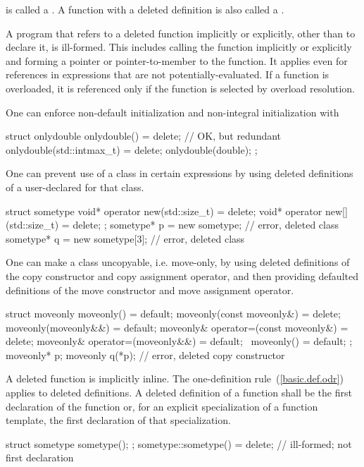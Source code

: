 is called a . A function with a
deleted definition is also called a .

\pnum
A program that refers to a deleted function implicitly or explicitly, other
than to declare it, is ill-formed. \enternote This includes calling the function
implicitly or explicitly and forming a pointer or pointer-to-member to the
function. It applies even for references in expressions that are not
potentially-evaluated. If a function is overloaded, it is referenced only if the
function is selected by overload resolution. \exitnote

\pnum
\enterexample One can enforce non-default initialization and non-integral
initialization with

\begin{codeblock}
struct onlydouble {
  onlydouble() = delete;              // OK, but redundant
  onlydouble(std::intmax_t) = delete;
  onlydouble(double);
};
\end{codeblock}

\exitexample

\enterexample One can prevent use of a
class in certain  expressions by using deleted definitions
of a user-declared  for that class.

\begin{codeblock}
struct sometype {
  void* operator new(std::size_t) = delete;
  void* operator new[](std::size_t) = delete;
};
sometype* p = new sometype;     // error, deleted class 
sometype* q = new sometype[3];  // error, deleted class 
\end{codeblock}
\exitexample

\enterexample One can make a class uncopyable, i.e. move-only, by using deleted
definitions of the copy constructor and copy assignment operator, and then
providing defaulted definitions of the move constructor and move assignment operator.

\begin{codeblock}
struct moveonly {
  moveonly() = default;
  moveonly(const moveonly&) = delete;
  moveonly(moveonly&&) = default;
  moveonly& operator=(const moveonly&) = delete;
  moveonly& operator=(moveonly&&) = default;
  ~moveonly() = default;
};
moveonly* p;
moveonly q(*p); // error, deleted copy constructor
\end{codeblock}
\exitexample

\pnum
A deleted function is implicitly inline. \enternote The
one-definition rule~(\ref{basic.def.odr}) applies to deleted definitions. \exitnote
A deleted definition of a function shall be the first declaration of the function or,
for an explicit specialization of a function template, the first declaration of that
specialization.
\enterexample
\begin{codeblock}
struct sometype {
  sometype();
};
sometype::sometype() = delete;      // ill-formed; not first declaration
\end{codeblock}
\exitexample%

